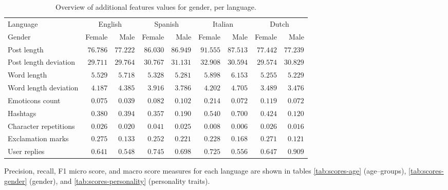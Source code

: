 \documentclass[10pt, a4paper]{article}
\begin{document}
\begin{table*}
\caption{Overview of additional features values for gender, per language.}
\label{tab:additionalfeatures-gender}
\begin{center}
\begin{tabular}{l|rr|rr|rr|rr}
\toprule
Language & \multicolumn{2}{|c|}{English} & \multicolumn{2}{|c}{Spanish} & \multicolumn{2}{|c}{Italian} & \multicolumn{2}{|c}{Dutch} \\
Gender & Female & Male & Female & Male & Female & Male & Female & Male \\
\midrule
Post length & $ 76.786 $ & $ 77.222 $ & $ 86.030 $ & $ 86.949 $ & $ 91.555 $ & $ 87.513 $ & $ 77.442 $ & $ 77.239 $ \\
Post length deviation & $ 29.711 $ & $ 29.764 $ & $ 30.767 $ & $ 31.131 $ & $ 32.908 $ & $ 30.594 $ & $ 29.574 $ & $ 30.829 $ \\
Word length & $ 5.529 $ & $ 5.718 $ & $ 5.328 $ & $ 5.281 $ & $ 5.898 $ & $ 6.153 $ & $ 5.255 $ & $ 5.229 $ \\
Word length deviation & $ 4.187 $ & $ 4.385 $ & $ 3.916 $ & $ 3.786 $ & $ 4.202 $ & $ 4.705 $ & $ 3.489 $ & $ 3.476 $ \\
Emoticons count & $ 0.075 $ & $ 0.039 $ & $ 0.082 $ & $ 0.102 $ & $ 0.214 $ & $ 0.072 $ & $ 0.119 $ & $ 0.072 $ \\
Hashtags &  $ 0.380 $ & $ 0.394 $ & $ 0.357 $ & $ 0.190 $ & $ 0.540 $ & $ 0.700 $ & $ 0.424 $ & $ 0.120 $ \\
Character repetitions & $ 0.026 $ & $ 0.020 $ & $ 0.041 $ & $ 0.025 $ & $ 0.008 $ & $ 0.006 $ & $ 0.026 $ & $ 0.016 $ \\
Exclamation marks & $ 0.275 $ & $ 0.133 $ & $ 0.252 $ & $ 0.221 $ & $ 0.228 $ & $ 0.168 $ & $ 0.271 $ & $ 0.121 $ \\
User replies & $ 0.641 $ & $ 0.548 $ & $ 0.745 $ & $ 0.698 $ & $ 0.725 $ & $ 0.556 $ & $ 0.647 $ & $ 0.909 $ \\
\bottomrule
\end{tabular}
\end{center}
\end{table*}

Precision, recall, F1 micro score, and macro score measures for each language are shown in tables \ref{tab:scores-age} (age--groups), \ref{tab:scores-gender} (gender), and \ref{tab:scores-personality} (personality traits).
\end{document}
